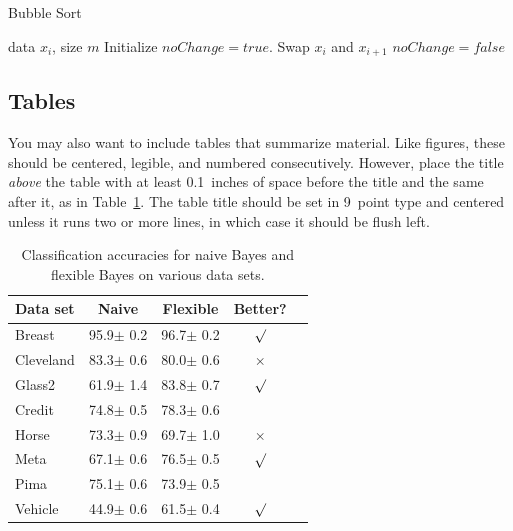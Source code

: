 \begin{algorithm}[tb]
   \caption{Bubble Sort}
   \label{alg:example}
\begin{algorithmic}
    data $x_i$, size $m$
   \Repeat
   \State Initialize $noChange = true$.
   \State Swap $x_i$ and $x_{i+1}$
   \State $noChange = false$
   \EndIf
   \EndFor
\end{algorithmic}
\end{algorithm}

\subsection{Tables}

You may also want to include tables that summarize material. Like
figures, these should be centered, legible, and numbered consecutively.
However, place the title \emph{above} the table with at least
0.1~inches of space before the title and the same after it, as in
Table~\ref{sample-table}. The table title should be set in 9~point
type and centered unless it runs two or more lines, in which case it
should be flush left.


\begin{table}[t]
\caption{Classification accuracies for naive Bayes and flexible
Bayes on various data sets.}
\label{sample-table}
\vskip 0.15in
\begin{center}
\begin{small}
\begin{sc}
\begin{tabular}{lcccr}
\toprule
Data set & Naive & Flexible & Better? \\
\midrule
Breast    & 95.9$\pm$ 0.2& 96.7$\pm$ 0.2& $\surd$ \\
Cleveland & 83.3$\pm$ 0.6& 80.0$\pm$ 0.6& $\times$\\
Glass2    & 61.9$\pm$ 1.4& 83.8$\pm$ 0.7& $\surd$ \\
Credit    & 74.8$\pm$ 0.5& 78.3$\pm$ 0.6&         \\
Horse     & 73.3$\pm$ 0.9& 69.7$\pm$ 1.0& $\times$\\
Meta      & 67.1$\pm$ 0.6& 76.5$\pm$ 0.5& $\surd$ \\
Pima      & 75.1$\pm$ 0.6& 73.9$\pm$ 0.5&         \\
Vehicle   & 44.9$\pm$ 0.6& 61.5$\pm$ 0.4& $\surd$ \\
\bottomrule
\end{tabular}
\end{sc}
\end{small}
\end{center}
\vskip -0.1in
\end{table}